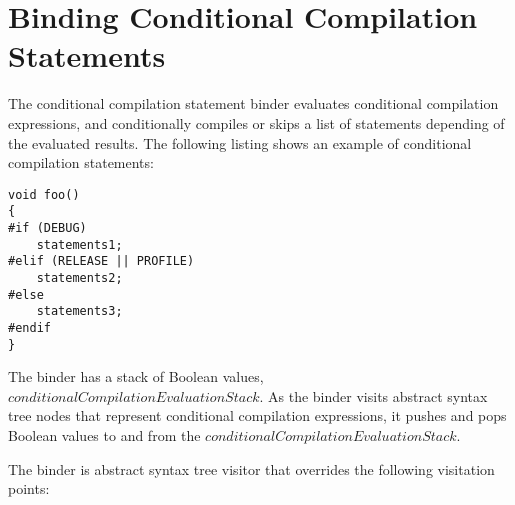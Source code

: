 \documentclass[a4paper,oneside,11pt]{book}
\theoremstyle{definition}
\begin{document}
\section{Binding Conditional Compilation Statements}

The conditional compilation statement binder evaluates conditional compilation expressions,
and conditionally compiles or skips a list of statements depending of the evaluated results.
The following listing shows an example of conditional compilation statements:

\lstset{language=Cmajor}
\begin{lstlisting}[frame=trBL]
void foo()
{
#if (DEBUG)
    statements1;
#elif (RELEASE || PROFILE)
    statements2;
#else
    statements3;
#endif
}
\end{lstlisting}

The binder has a stack of Boolean values, $conditionalCompilationEvaluationStack$.
As the binder visits abstract syntax tree nodes that represent conditional compilation expressions,
it pushes and pops Boolean values to and from the $conditionalCompilationEvaluationStack$.

The binder is abstract syntax tree visitor that overrides the following visitation points:
\end{document}
